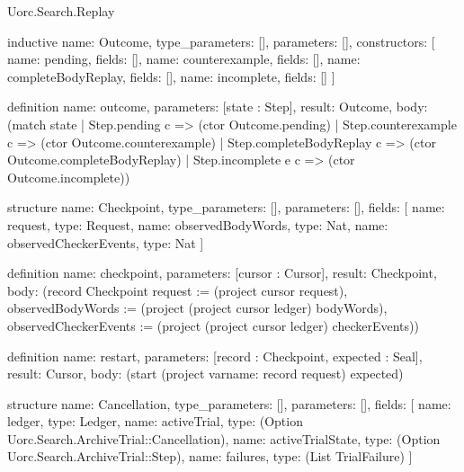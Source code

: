 \begin{lexlean}{Uorc.Search.Replay}
\begin{semanticmodule}
inductive{
  name: Outcome,
  type_parameters: [],
  parameters: [],
  constructors: [
    {name: pending, fields: []},
    {name: counterexample, fields: []},
    {name: completeBodyReplay, fields: []},
    {name: incomplete, fields: []}
  ]
}

definition{
  name: outcome,
  parameters: [state : Step],
  result: Outcome,
  body: (match state
    | Step.pending c => (ctor Outcome.pending)
    | Step.counterexample c => (ctor Outcome.counterexample)
    | Step.completeBodyReplay c => (ctor Outcome.completeBodyReplay)
    | Step.incomplete e c => (ctor Outcome.incomplete))
}

structure{
  name: Checkpoint,
  type_parameters: [],
  parameters: [],
  fields: [
    {name: request, type: Request},
    {name: observedBodyWords, type: Nat},
    {name: observedCheckerEvents, type: Nat}
  ]
}

definition{
  name: checkpoint,
  parameters: [cursor : Cursor],
  result: Checkpoint,
  body: (record Checkpoint {request := (project cursor request), observedBodyWords := (project (project cursor ledger) bodyWords), observedCheckerEvents := (project (project cursor ledger) checkerEvents)})
}

definition{
  name: restart,
  parameters: [record : Checkpoint, expected : Seal],
  result: Cursor,
  body: (start (project var{name: record} request) expected)
}

structure{
  name: Cancellation,
  type_parameters: [],
  parameters: [],
  fields: [
    {name: ledger, type: Ledger},
    {name: activeTrial, type: (Option Uorc.Search.ArchiveTrial::Cancellation)},
    {name: activeTrialState, type: (Option Uorc.Search.ArchiveTrial::Step)},
    {name: failures, type: (List TrialFailure)}
  ]
}


\end{semanticmodule}
\end{lexlean}
